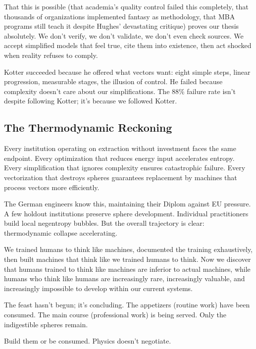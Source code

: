 That this is possible (that academia's quality control failed this completely, that thousands of organizations implemented fantasy as methodology, that MBA programs still teach it despite Hughes' devastating critique) proves our thesis absolutely. We don't verify, we don't validate, we don't even check sources. We accept simplified models that feel true, cite them into existence, then act shocked when reality refuses to comply.

Kotter succeeded because he offered what vectors want: eight simple steps, linear progression, measurable stages, the illusion of control. He failed because complexity doesn't care about our simplifications. The 88\% failure rate isn't despite following Kotter; it's because we followed Kotter.

\subsection{The Thermodynamic Reckoning}

Every institution operating on extraction without investment faces the same endpoint. Every optimization that reduces energy input accelerates entropy. Every simplification that ignores complexity ensures catastrophic failure. Every vectorization that destroys spheres guarantees replacement by machines that process vectors more efficiently.

The German engineers know this, maintaining their Diplom against EU pressure. A few holdout institutions preserve sphere development. Individual practitioners build local negentropy bubbles. But the overall trajectory is clear: thermodynamic collapse accelerating.

We trained humans to think like machines, documented the training exhaustively, then built machines that think like we trained humans to think. Now we discover that humans trained to think like machines are inferior to actual machines, while humans who think like humans are increasingly rare, increasingly valuable, and increasingly impossible to develop within our current systems.

The feast hasn't begun; it's concluding. The appetizers (routine work) have been consumed. The main course (professional work) is being served. Only the indigestible spheres remain.

Build them or be consumed. Physics doesn't negotiate.
